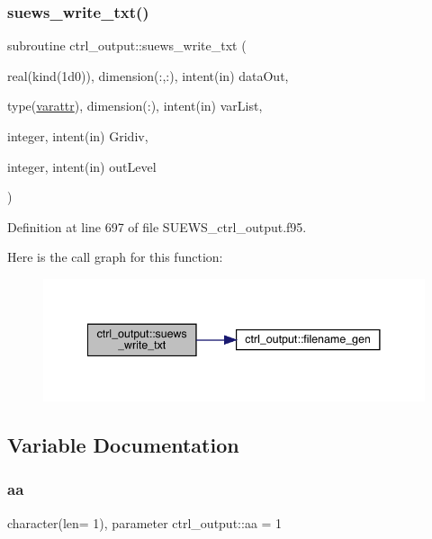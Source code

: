\subsubsection{\texorpdfstring{suews\+\_\+write\+\_\+txt()}{suews\_write\_txt()}}
{\footnotesize\ttfamily subroutine ctrl\+\_\+output\+::suews\+\_\+write\+\_\+txt (\begin{DoxyParamCaption}\item[{real(kind(1d0)), dimension(\+:,\+:), intent(in)}]{data\+Out,  }\item[{type(\hyperlink{structctrl__output_1_1varattr}{varattr}), dimension(\+:), intent(in)}]{var\+List,  }\item[{integer, intent(in)}]{Gridiv,  }\item[{integer, intent(in)}]{out\+Level }\end{DoxyParamCaption})}



Definition at line 697 of file S\+U\+E\+W\+S\+\_\+ctrl\+\_\+output.\+f95.

Here is the call graph for this function\+:\nopagebreak
\begin{figure}[H]
\begin{center}
\leavevmode
\includegraphics[width=341pt]{namespacectrl__output_a84e30d3564e406535ea078c470a62668_cgraph}
\end{center}
\end{figure}


\subsection{Variable Documentation}
\mbox{\label{namespacectrl__output_a51a0e846694f677a954a439b2d0069ce}} 
\subsubsection{\texorpdfstring{aa}{aa}}
{\footnotesize\ttfamily character(len= 1), parameter ctrl\+\_\+output\+::aa = \textquotesingle{}1\textquotesingle{}}



